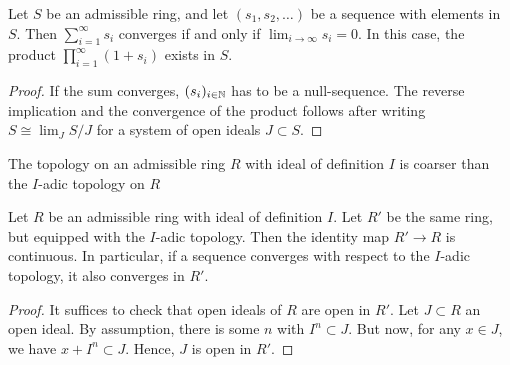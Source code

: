 \documentclass[../main.tex]{subfiles}
\begin{document}
\begin{lem}\label{lem:infiniteseriesandproducts}
  Let $S$ be an admissible ring, and let $(s_1, s_2, \dots)$ be a sequence with
  elements in $S$. Then $\sum_{i = 1}^\infty s_i$ converges if and only if 
   $\lim_{i \to \infty} s_i = 0$. In this case, the product $\prod_{i=1}^\infty (1 + s_i)$
   exists in $S$.
\begin{proof}
  If the sum converges, $(s_i)_{i \in \mathbb{N}}$ has to be a null-sequence. The
  reverse implication and the convergence of the product follows after writing
  $S \cong \lim_{J} S/J$ for a system of open ideals $J \subset S$. 
\end{proof}

The topology on an admissible ring $R$ with ideal of definition $I$ is coarser
than the $I$-adic topology on $R$
\begin{lem}\label{lem:AdmAdicComp}
  Let $R$ be an admissible ring with ideal of definition $I$. Let $R'$ be the same 
  ring, but equipped with the $I$-adic topology. Then the identity map $R' \to R$
  is continuous. In particular, if a sequence converges with respect to the
  $I$-adic topology, it also converges in $R'$.
\begin{proof}
  It suffices to check that open ideals of $R$ are open in $R'$. 
  Let $J \subset R$ an open ideal. By assumption, there is some $n$ with $I^n
  \subset J$. But now, for any $x \in J$, we have $x + I^n \subset J$. Hence,
  $J$ is open in $R'$.
\end{proof}
\end{lem}

\end{lem}
\end{document}
